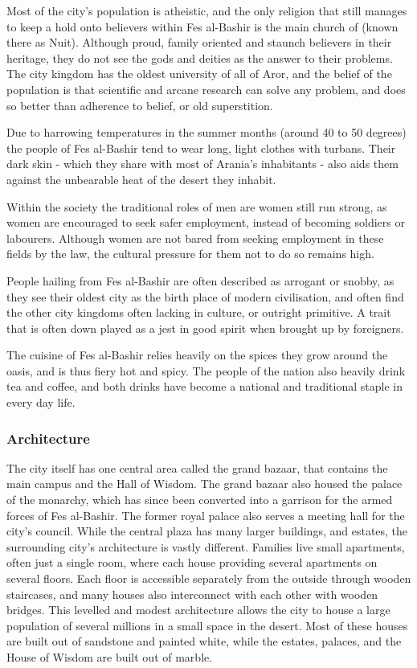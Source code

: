 Most of the city's population is atheistic, and the only religion that still
manages to keep a hold onto believers within Fes al-Bashir is the main church
of  (known there as Nuit). Although proud, family oriented
and staunch believers in their heritage, they do not see the gods and deities
as the answer to their problems. The city kingdom has the oldest university of
all of Aror, and the belief of the population is that scientific and arcane
research can solve any problem, and does so better than adherence to belief,
or old superstition.

Due to harrowing temperatures in the summer months (around 40 to 50 degrees)
the people of Fes al-Bashir tend to wear long, light clothes with
turbans. Their dark skin - which they share with most of Arania's inhabitants
- also aids them against the unbearable heat of the desert they inhabit.

Within the society the traditional roles of men are women still run strong, as
women are encouraged to seek safer employment, instead of becoming soldiers or
labourers. Although women are not bared from seeking employment in these
fields by the law, the cultural pressure for them not to do so remains high.

People hailing from Fes al-Bashir are often described as arrogant or snobby,
as they see their oldest city as the birth place of modern civilisation, and
often find the other city kingdoms often lacking in culture, or outright
primitive. A trait that is often down played as a jest in good spirit when
brought up by foreigners.

The cuisine of Fes al-Bashir relies heavily on the spices they grow around the
oasis, and is thus fiery hot and spicy. The people of the nation also heavily
drink tea and coffee, and both drinks have become a national and traditional
staple in every day life.

\subsubsection{Architecture}

The city itself has one central area called the grand bazaar, that contains the
main campus and the Hall of Wisdom. The grand bazaar also housed the palace of
the monarchy, which has since been converted into a garrison for the armed
forces of Fes al-Bashir. The former royal palace also serves a meeting hall
for the city's council. While the central plaza has many larger buildings, and
estates, the surrounding city's architecture is vastly different. Families live
small apartments, often just a single room, where each house providing several
apartments on several floors. Each floor is accessible separately from the
outside through wooden staircases, and many houses also interconnect with each
other with wooden bridges. This levelled and modest architecture allows the
city to house a large population of several millions in a small space in the
desert. Most of these houses are built out of sandstone and painted white, while
the estates, palaces, and the House of Wisdom are built out of marble.

